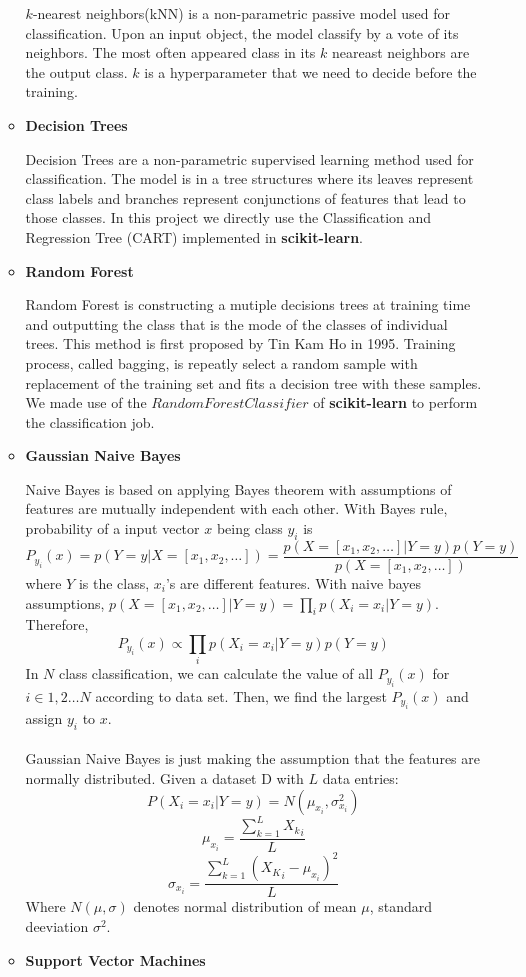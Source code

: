 \documentclass[11.5pt]{article}
\begin{document}
\begin{enumerate}
\begin{itemize}
                $k$-nearest neighbors(kNN) is a non-parametric passive model used for classification. Upon an input object, the model classify by a vote of its neighbors. The most often appeared class in its $k$ neareast neighbors are the output class. $k$ is a hyperparameter that we need to decide before the training.
                \item \textbf{Decision Trees}
                
                Decision Trees are a non-parametric supervised learning method used for classification. The model is in a tree structures where its leaves represent class labels and branches represent conjunctions of features that lead to those classes. In this project we directly use the Classification and Regression Tree (CART) implemented in \textbf{scikit-learn}\cite{scikit-learn}.
                \item \textbf{Random Forest}
                
                Random Forest is constructing a mutiple decisions trees at training time and outputting the class that is the mode of the classes of individual trees. This method is first proposed by Tin Kam Ho in 1995\cite{random_forest}. Training process, called bagging\cite{rf_bagging}, is repeatly select a random sample with replacement of the training set and fits a decision tree with these samples. We made use of the $RandomForestClassifier$ of \textbf{scikit-learn}\cite{scikit-learn} to perform the classification job.
                \item \textbf{Gaussian Naive Bayes}
                
                Naive Bayes is based on applying Bayes theorem with assumptions of features are mutually independent with each other. With Bayes rule, probability of a input vector $x$ being class $y_i$ is 
                $$P_{y_i}(x) = p(Y = y | X = [x_1, x_2, \dots] ) = \frac{p( X = [x_1, x_2, \dots] | Y = y)p(Y = y)}{p(X = [x_1, x_2, \dots])} $$
                where $Y$ is the class, $x_i$'s are different features. With naive bayes assumptions, $p(X = [x_1, x_2, \dots] | Y = y) = \prod_i p(X_i = x_i | Y = y)$. Therefore,
                $$P_{y_i}(x) \propto \prod_i p(X_i = x_i | Y = y)p(Y = y)$$
                In $N$ class classification, we can calculate the value of all $P_{y_i}(x)$ for $i \in 1,2 \dots N$ according to data set. Then, we find the largest $P_{y_i}(x)$ and assign $y_i$ to $x$.\\ \\
                Gaussian Naive Bayes is just making the assumption that the features are normally distributed. Given a dataset D with $L$ data entries:
                $$P(X_i = x_i | Y = y) = N(\mu_{x_i}, \sigma^2_{x_i})$$
                $$\mu_{x_i} = \frac{\sum_{k = 1}^L {X_k}_i}{L}$$
                $$\sigma_{x_i} = \frac{\sum_{k = 1}^L ({X_K}_i - \mu_{x_i})^2}{L}$$
                Where $N(\mu, \sigma)$ denotes normal distribution of mean $\mu$, standard deeviation $\sigma^2$.
                \item \textbf{Support Vector Machines}
                

\end{itemize}
\end{enumerate}
\end{document}
